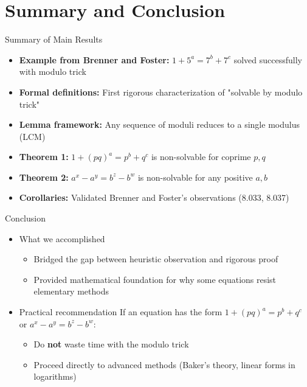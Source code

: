 \section{Summary and Conclusion}

\begin{frame}{Summary of Main Results}
    \begin{itemize}
        \item \textbf{Example from Brenner and Foster:} $1+5^a = 7^b+7^c$ solved successfully with modulo trick
        
        \item \textbf{Formal definitions:} First rigorous characterization of "solvable by modulo trick"
        
        \item \textbf{Lemma framework:} Any sequence of moduli reduces to a single modulus (LCM)
        
        \item \textbf{Theorem 1:} $1+(pq)^a = p^b+q^c$ is non-solvable for coprime $p,q$
        
        \item \textbf{Theorem 2:} $a^x-a^y = b^z-b^w$ is non-solvable for any positive $a,b$
        
        \item \textbf{Corollaries:} Validated Brenner and Foster's observations (8.033, 8.037)
    \end{itemize}
\end{frame}

\begin{frame}{Conclusion}
\begin{itemize}
    \item[] \begin{block}{What we accomplished}
        \begin{itemize}
            \item Bridged the gap between heuristic observation and rigorous proof
            \item Provided mathematical foundation for why some equations resist elementary methods
        \end{itemize}
    \end{block}
    
    \item[] \begin{block}{Practical recommendation}
        If an equation has the form $1+(pq)^a = p^b+q^c$ or $a^x-a^y = b^z-b^w$:
        \begin{itemize}
            \item Do \textbf{not} waste time with the modulo trick
            \item Proceed directly to advanced methods (Baker's theory, linear forms in logarithms)
        \end{itemize}
    \end{block}
\end{itemize}

\end{frame}

